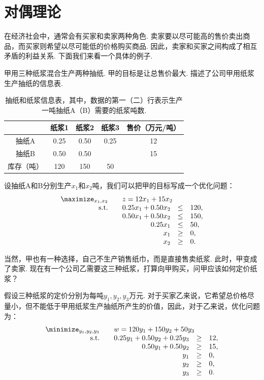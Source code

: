 \chapter{对偶理论}\label{chap:duality}

在经济社会中，通常会有买家和卖家两种角色. 卖家要以尽可能高的售价卖出商品，而买家则希望以尽可能低的价格购买商品. 因此，卖家和买家之间构成了相互矛盾的利益关系. 下面我们来看一个具体的例子. 

甲用三种纸浆混合生产两种抽纸. 甲的目标是让总售价最大.  描述了公司甲用纸浆生产抽纸的信息表. 
\begin{table}[ht]
        \centering
        \begin{tabular}{c|ccc|c}
        \hline
            & 纸浆1&纸浆2&纸浆3&售价（万元/吨） \\
            \hline
             抽纸A  & 0.25&0.50&0.25&12 \\
             抽纸B  & 0.50&0.50& &15\\
             \hline
             库存（吨）&120&150&50& \\
             \hline
        \end{tabular}
        \caption{抽纸和纸浆信息表，其中，数据的第一（二）行表示生产一吨抽纸A（B）需要的纸浆吨数. }
        \label{tab:cleaner-intro}
\end{table}

设抽纸A和B分别生产$x_1$和$x_2$吨，我们可以把甲的目标写成一个优化问题：
\begin{align*}
\begin{array}{rrcl}
\displaystyle\maximize_{x_1,x_2}\quad&\multicolumn{3}{l}{z=12x_1+15x_2}\\
\text{s.t.}\quad&0.25x_1+0.50x_2&\le&120,\\
&0.50x_1+0.50x_2&\le&150,\\
&0.25x_1&\le& 50,\\
&x_1&\ge& 0,\\
&x_2&\ge& 0.
\end{array}
\end{align*}

当然，甲也有一种选择，自己不生产销售纸巾，而是直接售卖纸浆. 此时，甲变成了卖家. 现在有一个公司乙需要这三种纸浆，打算向甲购买，问甲应该如何定价纸浆？

假设三种纸浆的定价分别为每吨$y_1,y_2,y_3$万元. 对于买家乙来说，它希望总价格尽量小，但不能低于甲用纸浆生产抽纸所产生的价值，因此，对于乙来说，优化问题为：
\[
 \begin{array}{rrcl}
\displaystyle\minimize_{y_1,y_2,y_3}\quad&\multicolumn{3}{l}{w=120y_1+150y_2+50y_3} \\
\text{s.t.}\quad& 0.25y_1+0.50y_2+0.25y_3&\ge&12,\\
&0.50y_1+0.50y_2&\ge&15,\\
&y_1&\ge&0,\\
&y_2&\ge&0,\\
&y_3&\ge&0.
 \end{array}
\]

